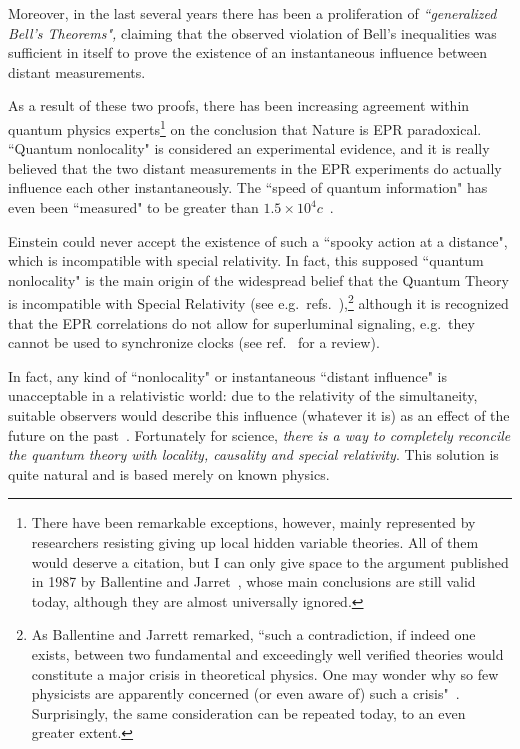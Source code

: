 \documentclass[published]{JHEP3}
\begin{document}
Moreover, in the last several years there has been a proliferation
of \emph{``generalized Bell's Theorems",} claiming that the
observed violation of  Bell's inequalities was sufficient in
itself to prove the existence of an instantaneous influence
between distant measurements.

As a result of these two proofs, there has been increasing agreement
within quantum physics experts\footnote{There have been remarkable
exceptions, however, mainly represented by researchers resisting
giving up local hidden variable theories. All of them would deserve a
citation, but I can only give space to the argument published in 1987
by Ballentine and Jarret~\cite{BaJa87}, whose main conclusions are
still valid today, although they are almost universally ignored.} on
the conclusion that Nature is EPR paradoxical. ``Quantum nonlocality"
is considered an experimental evidence, and it is really believed that
the two distant measurements in the EPR experiments do actually
influence each other instantaneously. The ``speed of quantum
information" has even been ``measured" to be greater than
$1.5\times10^{4}c$~\cite{Scarani}.

Einstein could never accept the existence of such a ``spooky action at
a distance", which is incompatible with special relativity. In fact,
this supposed ``quantum nonlocality" is the main origin of the
widespread belief that the Quantum Theory is incompatible with Special
Relativity (see e.g.\ refs.~\cite{measrel,Scarani}),\footnote{As
Ballentine and Jarrett remarked, ``such a contradiction, if indeed one
exists, between two fundamental and exceedingly well verified theories
would constitute a major crisis in theoretical physics. One may wonder
why so few physicists are apparently concerned (or even aware of) such
a crisis"~\cite{BaJa87}. Surprisingly, the same consideration can be
repeated today, to an even greater extent.} although it is recognized
that the EPR correlations do not allow for superluminal signaling,
e.g.\ they cannot be used to synchronize clocks (see ref.~\cite{Laloe}
for a review).

In fact, any kind of ``nonlocality" or instantaneous ``distant
influence" is unacceptable in a relativistic world: due to the
relativity of the simultaneity, suitable observers would describe this
influence (whatever it is) as an effect of the future on the
past~\cite{BaJa87}. Fortunately for science, \emph{there is a way to
completely reconcile the quantum theory with locality, causality and
special relativity}. This solution is quite natural and is based
merely on known physics.
\end{document}
